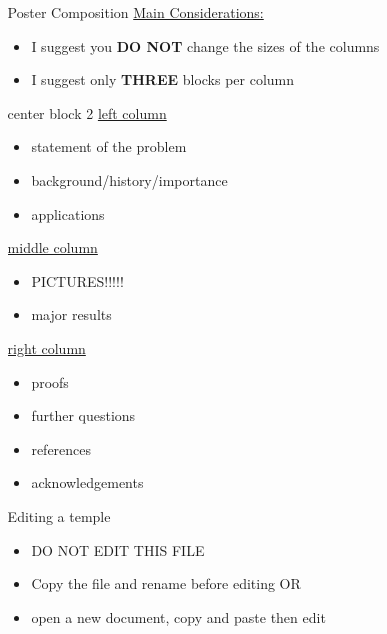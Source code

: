 \documentclass[leqno,presentation]{beamer}
\begin{document}
\begin{frame}
\begin{columns}[t]
\begin{column}[t]{.25\linewidth}
\end{column}

\begin{column}{.45\linewidth}

\begin{block}{Poster Composition}
\underline{Main Considerations:}
\begin{itemize}
\item I suggest you \textbf{DO NOT} change the sizes of the columns
\item I suggest only \textbf{THREE} blocks per column
\end{itemize}
\end{block}

\begin{block}{center block 2}
\underline{left column}
\begin{itemize}
 \item statement of the problem
\item background/history/importance
\item applications
\end{itemize}
\underline{middle column}
\begin{itemize}
 \item PICTURES!!!!!
\item  major results
\end{itemize}
\underline{right column}
\begin{itemize}
\item proofs
\item further questions
\item references
\item acknowledgements
\end{itemize}
\end{block}

\begin{block}{Editing a temple}
\begin{itemize}
\item DO NOT EDIT THIS FILE
\item Copy the file and rename before editing OR
\item open a new document, copy and paste then edit
\end{itemize}
\end{block}


\end{column}
\end{columns}
\end{frame}
\end{document}
